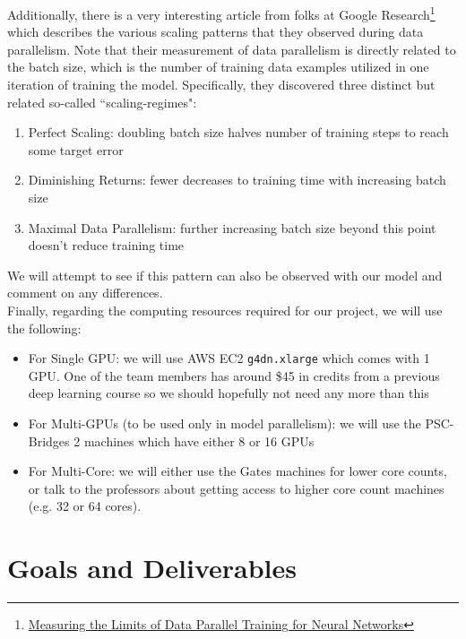 \documentclass{article}
\begin{document}
Additionally, there is a very interesting article from folks at Google Research\footnote{\href{https://ai.googleblog.com/2019/03/measuring-limits-of-data-parallel.html}{Measuring the Limits of Data Parallel Training for Neural Networks}} which describes the various scaling patterns that they observed during data parallelism. Note that their measurement of data parallelism is directly related to the batch size, which is the number of training data examples utilized in one iteration of training the model. Specifically, they discovered three distinct but related so-called ``scaling-regimes":
\begin{enumerate}
  \item Perfect Scaling: doubling batch size halves number of training steps to reach some target error
  \item Diminishing Returns: fewer decreases to training time with increasing batch size
  \item Maximal Data Parallelism: further increasing batch size beyond this point doesn’t reduce training time
\end{enumerate}

We will attempt to see if this pattern can also be observed with our model and comment on any differences. \\

\noindent Finally, regarding the computing resources required for our project, we will use the following:

\begin{itemize}
  \item For Single GPU: we will use AWS EC2 \texttt{g4dn.xlarge} which comes with 1 GPU. One of the team members has around \$45 in credits from a previous deep learning course so we should hopefully not need any more than this
  \item For Multi-GPUs (to be used only in model parallelism): we will use the PSC-Bridges 2 machines which have either 8 or 16 GPUs
  \item For Multi-Core: we will either use the Gates machines for lower core counts, or talk to the professors about getting access to higher core count machines (e.g. 32 or 64 cores).
\end{itemize}

\section*{Goals and Deliverables}
\end{document}
